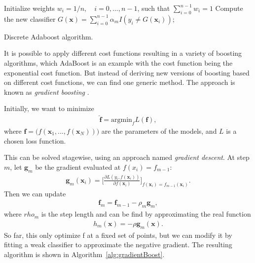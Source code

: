 \begin{algorithm}[H]
\SetAlgoLined
  Initialize weights $w_i = 1/n, \quad i=0,...,n-1$, such that $\sum_{i=0}^{n-1}w_i = 1$\;
 Compute the new classifier $G(\textbf{x}) = \sum_{i=0}^{n-1} \alpha_m I(y_i \neq G(\textbf{x}_i))$;
 \caption{Discrete Adaboost algorithm.}
 \label{alg:discreteAdaboost}
\end{algorithm}

It is possible to apply different cost functions resulting in a variety of boosting algorithms, which AdaBoost is an example with the cost function being the exponential cost function. But instead of deriving new versions of boosting based on different cost functions, we can find one generic method. The approach is known as \textit{gradient boosting} \cite{friedman2001}.

Initially, we want to minimize
\begin{align}
  \hat{\textbf{f}} = \text{argmin}_f L(\textbf{f}),
\end{align}
where $\textbf{f} = \big(f(\textbf{x}_1, ..., f(\textbf{x}_N)) \big)$ are the parameters of the models, and $L$ is a chosen loss function.

This can be solved stagewise, using an approach named \textit{gradient descent}. At step $m$, let $\textbf{g}_m$ be the gradient evaluated at $f(x_i) = f_{m-1}$:
\begin{align}
  \textbf{g}_m(\textbf{x}_i) = \Bigg[ \frac{\partial L(y_i, f(\textbf{x}_i))}{\partial f(\textbf{x}_i)} \Bigg]_{f(\textbf{x}_i)=f_{m-1}(\textbf{x}_i)}.
\end{align}
Then we can update
\begin{align}
  \textbf{f}_m = \textbf{f}_{m-1} - \rho_m \textbf{g}_m,
\end{align}
where $rho_m$ is the step length and can be find by approximating the real function
\begin{align}
  h_m(\textbf{x})= - \rho \textbf{g}_m(\textbf{x}).
\end{align}
So far, this only optimize f at a fixed set of points, but we can modify it by fitting a weak classifier to approximate the negative gradient. The resulting algorithm is shown in Algorithm~\ref{alg:gradientBoost}.

